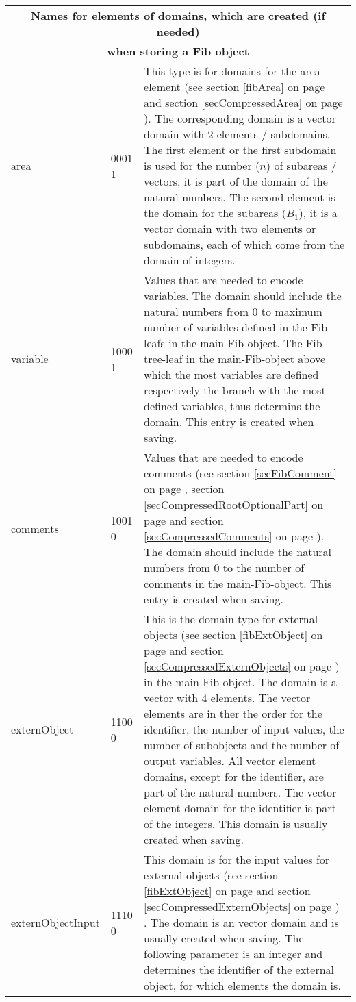 \begin{center}
\begin{longtable}{|p{25mm}|p{15mm}|p{85mm}|}
	\multicolumn{3}{|c|}{\textbf{Names for elements of domains, which are created (if needed)}}\\
	\multicolumn{3}{|c|}{\textbf{when storing a Fib object}}\\\hline

	area & 0001 1 & This type is for domains for the area element (see section \ref{fibArea} on page \pageref{fibArea} and section \ref{secCompressedArea} on page \pageref{secCompressedArea}).  The corresponding domain is a vector domain with 2 elements / subdomains. The first element or the first subdomain is used for the number ($n$) of subareas / vectors, it is part of the domain of the natural numbers. The second element is the domain for the subareas ($B_{1}$), it is a vector domain with two elements or subdomains, each of which come from the domain of integers. \\\hline
	variable & 1000 1 & Values that are needed to encode variables. The domain should include the natural numbers from 0 to maximum number of variables defined in the Fib leafs in the main-Fib object. The Fib tree-leaf in the main-Fib-object above which the most variables are defined respectively the branch with the most defined variables, thus determins the domain. This entry is created when saving.\\\hline
	comments & 1001 0 & Values that are needed to encode comments (see section \ref{secFibComment} on page \pageref{secFibComment}, section \ref{secCompressedRootOptionalPart} on page \pageref{secCompressedRootOptionalPart} and section \ref{secCompressedComments} on page \pageref{secCompressedComments}). The domain should include the natural numbers from 0 to the number of comments in the main-Fib-object. This entry is created when saving.\\\hline
	externObject & 1100 0 & This is the domain type for external objects (see section \ref{fibExtObject} on page \pageref{fibExtObject} and section \ref{secCompressedExternObjects} on page \pageref{secCompressedExternObjects}) in the main-Fib-object. The domain is a vector with 4 elements. The vector elements are in ther the order for the identifier, the number of input values, the number of subobjects and the number of output variables. All vector element domains, except for the identifier, are part of the natural numbers. The vector element domain for the identifier is part of the integers. This domain is usually created when saving.\\\hline
	externObject\-Input & 1110 0 & This domain is for the input values for external objects (see section \ref{fibExtObject} on page \pageref{fibExtObject} and section \ref{secCompressedExternObjects} on page \pageref{secCompressedExternObjects}) . The domain is an vector domain and is usually created when saving. The following parameter is an integer and determines the identifier of the external object, for which elements the domain is.\\\hline

\end{longtable}
\end{center}
